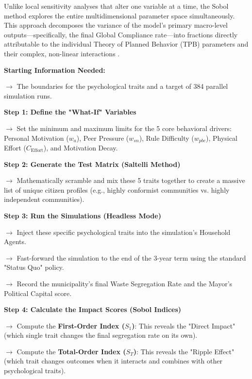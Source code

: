 Unlike local sensitivity analyses that alter one variable at a time, the Sobol method explores the entire multidimensional parameter space simultaneously. This approach decomposes the variance of the model's primary macro-level outputs—specifically, the final Global Compliance rate—into fractions directly attributable to the individual Theory of Planned Behavior (TPB) parameters and their complex, non-linear interactions \citep{ZhengAI2022}. 

\begin{algorithm}[H]
\caption{Global Sensitivity Analysis (Stress-Testing the Simulation)}
\label{alg:sobol_gsa_english}
\begin{algorithmic}[1]
\State \textbf{Starting Information Needed:} 
\State \parbox[t]{0.9\linewidth}{$\rightarrow$ The boundaries for the psychological traits and a target of 384 parallel simulation runs.\strut}
\Statex
\State \textbf{Step 1: Define the "What-If" Variables}
\State \parbox[t]{0.9\linewidth}{$\rightarrow$ Set the minimum and maximum limits for the 5 core behavioral drivers: Personal Motivation (\(w_a\)), Peer Pressure (\(w_{sn}\)), Rule Difficulty (\(w_{pbc}\)), Physical Effort (\(C_{\mathrm{Effort}}\)), and Motivation Decay.\strut}
\Statex
\State \textbf{Step 2: Generate the Test Matrix (Saltelli Method)}
\State \parbox[t]{0.9\linewidth}{$\rightarrow$ Mathematically scramble and mix these 5 traits together to create a massive list of unique citizen profiles (e.g., highly conformist communities vs. highly independent communities).\strut}
\Statex
\State \textbf{Step 3: Run the Simulations (Headless Mode)}
    \State \parbox[t]{0.88\linewidth}{$\rightarrow$ Inject these specific psychological traits into the simulation's Household Agents.\strut}
    \State \parbox[t]{0.88\linewidth}{$\rightarrow$ Fast-forward the simulation to the end of the 3-year term using the standard "Status Quo" policy.\strut}
    \State \parbox[t]{0.88\linewidth}{$\rightarrow$ Record the municipality's final Waste Segregation Rate and the Mayor's Political Capital score.\strut}
\EndFor
\Statex
\State \textbf{Step 4: Calculate the Impact Scores (Sobol Indices)}
\State \parbox[t]{0.9\linewidth}{$\rightarrow$ Compute the \textbf{First-Order Index (\(S_1\))}: This reveals the "Direct Impact" (which single trait changes the final segregation rate on its own).\strut}
\State \parbox[t]{0.9\linewidth}{$\rightarrow$ Compute the \textbf{Total-Order Index (\(S_T\))}: This reveals the "Ripple Effect" (which trait changes outcomes when it interacts and combines with other psychological traits).\strut}
\end{algorithmic}
\end{algorithm}

